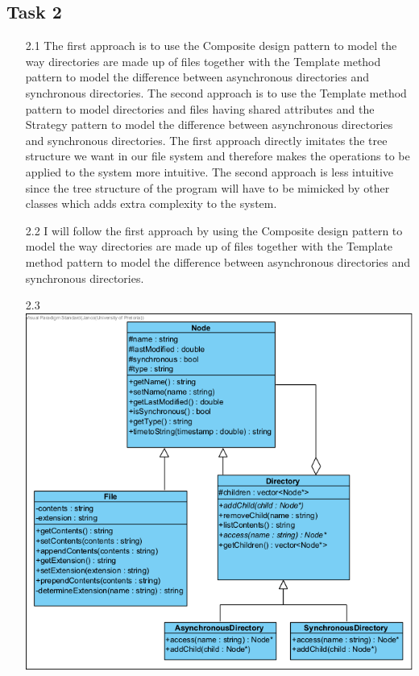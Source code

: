 \documentclass{article}
\begin{document}
\subsection*{Task 2}
\begin{itemize}
    \item[2.1]The first approach is to use the Composite design pattern to model the way directories are made up of files together with the Template method 
    pattern to model the difference between asynchronous directories and synchronous directories. The second approach is to use the Template method pattern 
    to model directories and files having shared attributes and the Strategy pattern to model the difference between asynchronous directories and synchronous
    directories. The first approach directly imitates the tree structure we want in our file system and therefore makes the operations to be applied to the system 
    more intuitive. The second approach is less intuitive since the tree structure of the program will have to be mimicked by other classes which adds extra 
    complexity to the system. 
    \item[2.2]I will follow the first approach by using the Composite design pattern to model the way directories are made up of files together with the Template
    method pattern to model the difference between asynchronous directories and synchronous directories.
    \item[2.3]\includegraphics[]{Task2.png}
\end{itemize}
\end{document}
